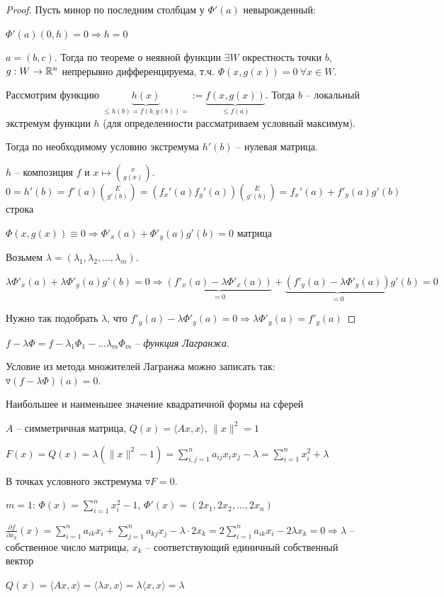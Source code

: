 \begin{proof}
    Пусть минор по последним столбцам у $\Phi'(a)$ невырожденный:

    $\Phi'(a)(0, h)=0\Rightarrow h=0$

    $a=(b, c)$. Тогда по теореме о неявной функции $\exists W$ окрестность точки $b$, $g: W\rightarrow \mathbb{R}^n$ непрерывно дифференцируема, т.ч. $\Phi(x, g(x))=0\ \forall x\in W$.

    Рассмотрим функцию $\underbrace{h(x)}_{\leq h(b)=f(b, g(b))= }:=\underbrace{f(x, g(x))}_{\leq f(a)}$. Тогда $b$ – локальный экстремум функции $h$ (для определенности рассматриваем условный максимум).

    Тогда по необходимому условию экстремума $h'(b)$ – нулевая матрица.

    $h$ – композиция $f$ и $x\mapsto \binom{x}{g(x)}$. $0=h'(b)=f'(a)\binom{E}{g'(b)}=(f_x'(a)f_y'(a))\binom{E}{g'(b)}=f_x'(a)+f'_y(a)g'(b)$ строка

    $\Phi(x, g(x))\equiv 0\Rightarrow \Phi'_x(a)+\Phi'_y(a)g'(b)=0$ матрица

    Возьмем $\lambda =(\lambda_1, \lambda_2, ..., \lambda_m)$. 
    
    $\lambda \Phi'_x(a)+\lambda\Phi'_y(a)g'(b)=0\Rightarrow\underbrace{(f'_x(a) - \lambda \Phi'_x(a))}_{=0}+\underbrace{(f'_y(a)-\lambda\Phi'_y(a))}_{=0}g'(b)=0$

    Нужно так подобрать $\lambda$, что $f'_y(a)-\lambda \Phi'_y(a)=0\Rightarrow\lambda \Phi'_y(a)=f'_y(a)$
\end{proof}

\begin{definition}
    $f-\lambda \Phi=f-\lambda_1 \Phi_1 - ... \lambda_m \Phi_m$ –  \textit{функция Лагранжа}.
\end{definition}

\begin{remark}
    Условие из метода множителей Лагранжа можно записать так: $\triangledown (f-\lambda \Phi)(a)=0$.
\end{remark}

\begin{example}
    Наибольшее и наименьшее значение квадратичной формы на сферей

    $A$ – симметричная матрица, $Q(x)=\langle Ax, x\rangle$, $\|x\|^2=1$

    $F(x)=Q(x)=\lambda (\|x\|^2-1)=\sum\limits_{i, j=1}^n a_{ij}x_ix_j-\lambda =\sum\limits_{i=1}^nx_i^2+\lambda$

    В точках условного экстремума $\triangledown F=0$.

    $m=1$: $\Phi(x) =\sum\limits_{i=1}^n x_i^2 -1$, $\Phi'(x)=(2x_1, 2x_2, ..., 2x_n)$

    $\frac{\partial f}{\partial x_k}(x)=\sum\limits_{i=1}^n a_{ik}x_i+\sum\limits_{j=1}^n a_{kj}x_j-\lambda \cdot 2x_k =2\sum\limits_{i=1}^n a_{ik}x_i-2\lambda x_k=0\Rightarrow \lambda$ –  собственное число матрицы, $x_k$ – соответствующий единичный собственный вектор

    $Q(x)=\langle Ax, x \rangle =\langle \lambda x, x\rangle=\lambda\langle  x, x\rangle =\lambda$
\end{example}

